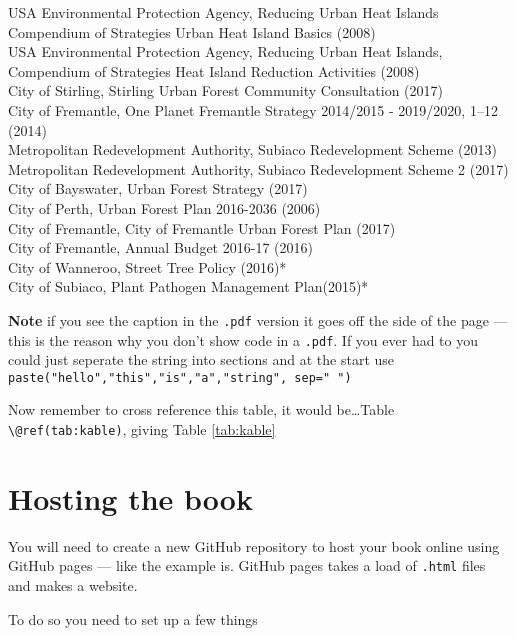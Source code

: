 \documentclass[
  12pt,
  oneside]{book}
\begin{document}
\begin{longtabu}
USA Environmental Protection Agency, Reducing Urban Heat Islands Compendium of Strategies Urban Heat Island Basics (2008)\\
\addlinespace
USA Environmental Protection Agency, Reducing Urban Heat Islands, Compendium of Strategies Heat Island Reduction Activities (2008)\\
City of Stirling, Stirling Urban Forest Community Consultation (2017)\\
City of Fremantle, One Planet Fremantle Strategy 2014/2015 - 2019/2020, 1–12 (2014)\\
Metropolitan Redevelopment Authority, Subiaco Redevelopment Scheme (2013)\\
Metropolitan Redevelopment Authority, Subiaco Redevelopment Scheme 2 (2017)\\
\addlinespace
City of Bayswater, Urban Forest Strategy (2017)\\
City of Perth, Urban Forest Plan 2016-2036 (2006)\\
City of Fremantle, City of Fremantle Urban Forest Plan (2017)\\
City of Fremantle, Annual Budget 2016-17 (2016)\\
City of Wanneroo, Street Tree Policy (2016)*\\
\addlinespace
City of Subiaco, Plant Pathogen Management Plan(2015)*\\
\bottomrule
\end{longtabu}

\textbf{Note} if you see the caption in the \texttt{.pdf} version it goes off the side of the page --- this is the reason why you don't show code in a \texttt{.pdf}. If you ever had to you could just seperate the string into sections and at the start use \texttt{paste("hello","this","is","a","string",\ sep="\ ")}

Now remember to cross reference this table, it would be\ldots Table \texttt{\textbackslash{}@ref(tab:kable)}, giving Table \ref{tab:kable}

\section{Hosting the book}\label{hosting-the-book}

You will need to create a new GitHub repository to host your book online using GitHub pages --- like the example is. GitHub pages takes a load of \texttt{.html} files and makes a website.

To do so you need to set up a few things
\end{document}
